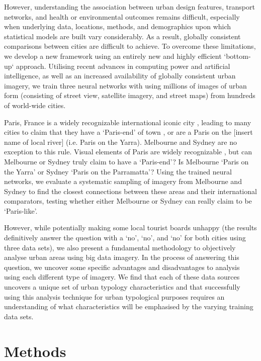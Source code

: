 \documentclass[10pt,letterpaper]{article}
\begin{document}
However, understanding the association between urban design features, transport networks, and health or environmental outcomes remains difficult, especially when underlying data, locations, methods, and demographics upon which statistical models are built vary considerably. As a result, globally consistent comparisons between cities are difficult to achieve. To overcome these limitations, we develop a new framework using an entirely new and highly efficient `bottom-up` approach. Utilising recent advances in computing power and artificial intelligence, as well as an increased availability of globally consistent urban imagery, we train three neural networks with using millions of images of urban form (consisting of street view, satellite imagery, and street maps) from hundreds of world-wide cities. 

Paris, France is a widely recognizable international iconic city \cite{Anholt2006}, leading to many cities to claim that they have a `Paris-end' of town \cite{Williams2010}, or are a Paris on the [insert name of local river] \cite{Wilden2013} (i.e. Paris on the Yarra). Melbourne and Sydney are no exception to this rule. Visual elements of Paris are widely recognizable \cite{Doersch2012}, but can Melbourne or Sydney truly claim to have a `Paris-end'? Is Melbourne `Paris on the Yarra' or Sydney `Paris on the Parramatta'? Using the trained neural networks, we evaluate a systematic sampling of imagery from Melbourne and Sydney to find the closest connections between these areas and their international comparators, testing whether either Melbourne or Sydney can really claim to be `Paris-like'.

However, while potentially making some local tourist boards unhappy (the results definitively answer the question with a `no', `no', and `no' for both cities using three data sets), we also present a fundamental methodology to objectively analyse urban areas using big data imagery. In the process of answering this question, we uncover some specific advantages and disadvantages to analysis using each different type of imagery. We find that each of these data sources uncovers a unique set of urban typology characteristics and that successfully using this analysis technique for urban typological purposes requires an understanding of what characteristics will be emphasised by the varying training data sets.




\section*{Methods}\label{sec:methods}
\end{document}
